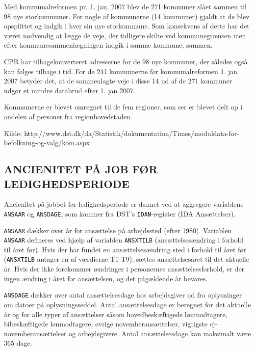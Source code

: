Med kommunalreformen pr. 1. jan. 2007 blev de 271 kommuner slået sammen til 98 nye storkommuner. For nogle af kommunerne (14 kommuner) gjaldt at de blev opsplittet og indgik i hver sin nye storkommune. Som konsekvens af dette har det været nødvendig at lægge de veje, der tidligere skilte ved kommunegrænsen men efter kommunesammenlægningen indgik i samme kommune, sammen.

CPR har tilbagekonverteret adresserne for de 98 nye kommuner, der således også kan følges tilbage i tid. For de 241 kommunerne før kommunalreformen 1. jan 2007 betyder det, at de sammenlagte veje i disse 14 ud af de 271 kommuner udgør et mindre databrud efter 1. jan 2007.

Kommunerne er blevet omregnet til de fem regioner, som ser er blevet delt op i andelen af personer fra regionhovedstaden.

Kilde: http://www.dst.dk/da/Statistik/dokumentation/Times/moduldata-for-befolkning-og-valg/kom.aspx


\subsection{ANCIENITET PÅ JOB FØR LEDIGHEDSPERIODE \label{}}

Ancienitet på jobbet før ledighedsperiode er dannet ved at aggregere variablene \texttt{ANSAAR} og \texttt{ANSDAGE}, som kommer fra DST's \texttt{IDAN}-register (IDA Ansættelser).

\texttt{ANSAAR} dækker over år for ansættelse på arbejdssted (efter 1980). Variablen \texttt{ANSAAR} defineres ved hjælp af variablen \texttt{ANSXTILB} (ansættelsesændring i forhold til året før). Hvis der har fundet en ansættelsesændring sted i forhold til året før (\texttt{ANSXTILB} antager en af værdierne T1-T9), sættes ansættelsesåret til det aktuelle år. Hvis der ikke forekommer ændringer i personernes ansættelsesforhold, er der ingen ændring i året for ansættelsen, og det pågældende år bevares.

\texttt{ANSDAGE} dækker over antal ansættelsesdage hos arbejdsgiver ud fra oplysninger om datoer på oplysningsseddel. Antal ansættelsesdage er beregnet for det aktuelle år og for alle typer af ansættelser såsom hovedbeskæftigede lønmodtagere, bibeskæftigede lønmodtagere, øvrige novemberansættelser, vigtigste ej-novemberansættelser og arbejdsgivere. Antal ansættelsesdage kan maksimalt være 365 dage.

